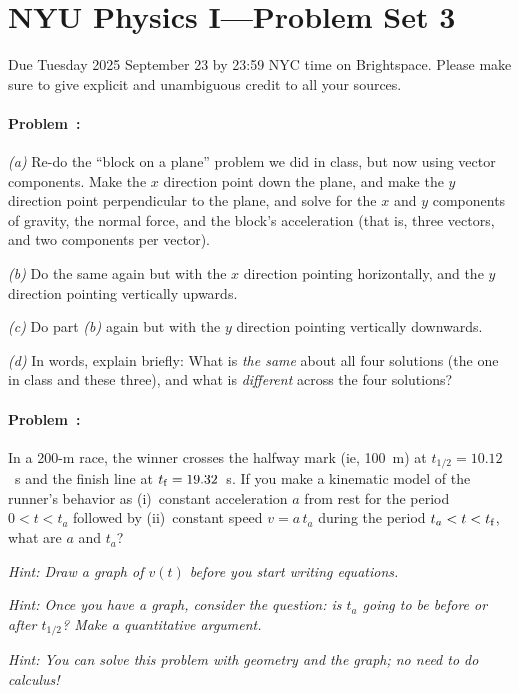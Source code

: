 \documentclass[12pt]{article}
\begin{document}
\section*{NYU Physics I---Problem Set 3}

Due Tuesday 2025 September 23 by 23:59 NYC time on Brightspace.
Please make sure to give explicit and unambiguous credit to all your sources.

\paragraph{Problem~\theproblem:}%
\textsl{(a)} Re-do the ``block on a plane'' problem we did in class, but now using
vector components. Make the $x$ direction point down the plane, and
make the $y$ direction point perpendicular to the plane, and solve for
the $x$ and $y$ components of gravity, the normal force, and the
block's acceleration (that is, three vectors, and two components per
vector).

\textsl{(b)} Do the same again but with the $x$ direction pointing horizontally,
and the $y$ direction pointing vertically upwards.

\textsl{(c)} Do part \textsl{(b)} again but with the $y$ direction pointing vertically
downwards.

\textsl{(d)} In words, explain briefly:
What is \emph{the same} about all four solutions (the one in class and these three),
and what is \emph{different} across the four solutions?

\paragraph{Problem~\theproblem:}%
In a 200-m race, the winner crosses the halfway mark (ie, 100~m) at
$t_{1/2}=10.12$~s and the finish line at $t_{\rm f}=19.32$~s.  If you
make a kinematic model of the runner's behavior as (i)~constant
acceleration $a$ from rest for the period $0<t<t_a$ followed by
(ii)~constant speed $v=a\,t_a$ during the period $t_a<t<t_{\rm f}$,
what are $a$ and $t_a$?

\emph{Hint: Draw a graph of $v(t)$ before you start writing equations.}

\emph{Hint: Once you have a graph, consider the question: is $t_a$
going to be before or after $t_{1/2}$?  Make a quantitative argument.}

\emph{Hint: You can solve this problem with geometry and the graph; no
  need to do calculus!}
\end{document}
